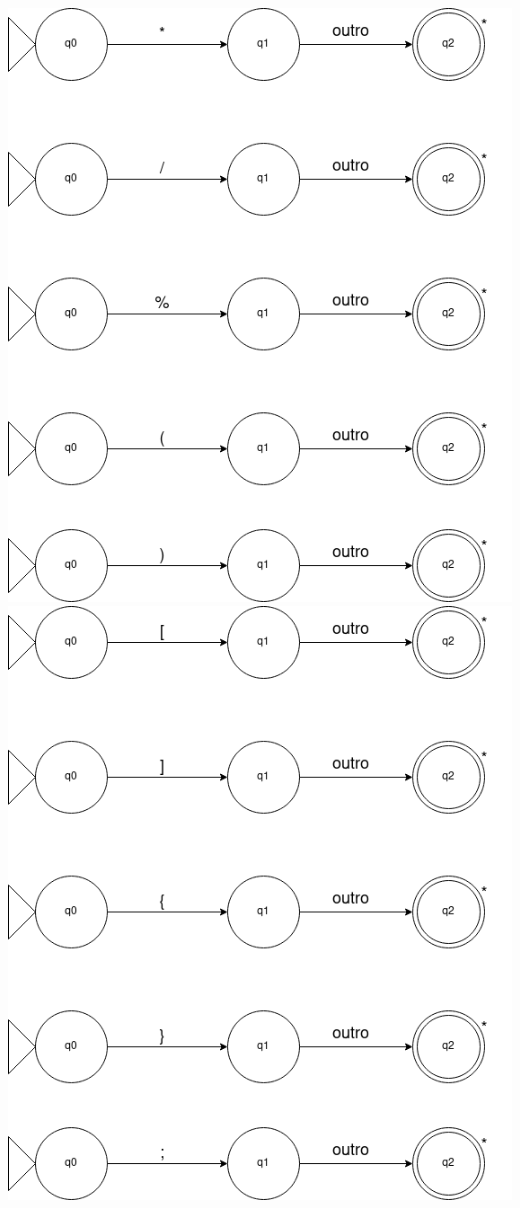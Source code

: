 \documentclass[
	12pt,				%
	openright,			%
	twoside,			%
	a4paper,			%
	english,			%
	french,				%
	spanish,			%
	brazil				%
	]{abntex2}
\begin{document}
\includegraphics[scale=0.7]{2.png}
\\
\includegraphics[scale=0.7]{3.png}
\end{document}
